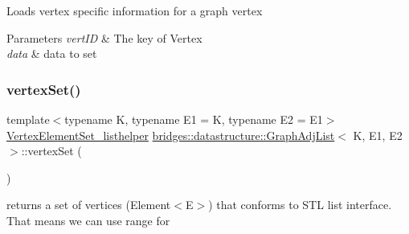 Loads vertex specific information for a graph vertex


\begin{DoxyParams}{Parameters}
{\em vert\+ID} & The key of Vertex \\
\hline
{\em data} & data to set \\
\hline
\end{DoxyParams}
\mbox{\label{classbridges_1_1datastructure_1_1_graph_adj_list_a9dcf0bb4a68f3b02281c84e9bb69d6b3}} 
\subsubsection{\texorpdfstring{vertex\+Set()}{vertexSet()}\hspace{0.1cm}{\footnotesize\ttfamily [1/2]}}
{\footnotesize\ttfamily template$<$typename K, typename E1 = K, typename E2 = E1$>$ \\
\mbox{\hyperlink{classbridges_1_1datastructure_1_1_graph_adj_list_1_1_vertex_element_set__listhelper}{Vertex\+Element\+Set\+\_\+listhelper}} \mbox{\hyperlink{classbridges_1_1datastructure_1_1_graph_adj_list}{bridges\+::datastructure\+::\+Graph\+Adj\+List}}$<$ K, E1, E2 $>$\+::vertex\+Set (\begin{DoxyParamCaption}{ }\end{DoxyParamCaption})\hspace{0.3cm}{\ttfamily [inline]}}



returns a set of vertices (Element$<$\+E$>$) that conforms to S\+TL list interface. That means we can use range for 

\mbox{\label{classbridges_1_1datastructure_1_1_graph_adj_list_a5ef96f5df21b2f9743b7bb79c10cf090}} 
